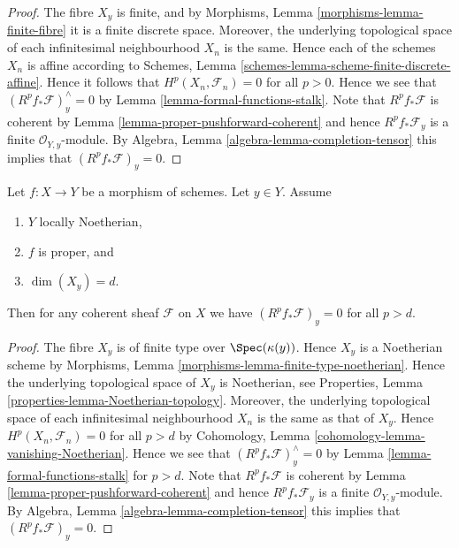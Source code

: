 \begin{proof}
The fibre $X_y$ is finite, and by
Morphisms, Lemma \ref{morphisms-lemma-finite-fibre} it
is a finite discrete space. Moreover, the underlying topological
space of each infinitesimal neighbourhood $X_n$ is the same.
Hence each of the schemes $X_n$ is affine according to
Schemes, Lemma \ref{schemes-lemma-scheme-finite-discrete-affine}.
Hence it follows that $H^p(X_n, \mathcal{F}_n) = 0$ for all
$p > 0$. Hence we see that $(R^pf_*\mathcal{F})_y^\wedge = 0$
by Lemma \ref{lemma-formal-functions-stalk}.
Note that $R^pf_*\mathcal{F}$ is coherent by
Lemma \ref{lemma-proper-pushforward-coherent} and
hence $R^pf_*\mathcal{F}_y$ is a finite
$\mathcal{O}_{Y, y}$-module.
By Algebra, Lemma \ref{algebra-lemma-completion-tensor}
this implies that $(R^pf_*\mathcal{F})_y = 0$.
\end{proof}

\begin{lemma}
\label{lemma-higher-direct-images-zero-above-dimension-fibre}
Let $f : X \to Y$ be a morphism of schemes.
Let $y \in Y$.
Assume
\begin{enumerate}
\item $Y$ locally Noetherian,
\item $f$ is proper, and
\item $\dim(X_y) = d$.
\end{enumerate}
Then for any coherent sheaf $\mathcal{F}$ on $X$ we have
$(R^pf_*\mathcal{F})_y = 0$ for all $p > d$.
\end{lemma}

\begin{proof}
The fibre $X_y$ is of finite type over $\Spec(\kappa(y))$.
Hence $X_y$ is a Noetherian scheme by
Morphisms, Lemma \ref{morphisms-lemma-finite-type-noetherian}.
Hence the underlying topological space of $X_y$ is Noetherian, see
Properties, Lemma \ref{properties-lemma-Noetherian-topology}.
Moreover, the underlying topological space of each infinitesimal
neighbourhood $X_n$ is the same as that of $X_y$.
Hence $H^p(X_n, \mathcal{F}_n) = 0$ for all $p > d$ by
Cohomology, Lemma \ref{cohomology-lemma-vanishing-Noetherian}.
Hence we see that $(R^pf_*\mathcal{F})_y^\wedge = 0$
by Lemma \ref{lemma-formal-functions-stalk} for $p > d$.
Note that $R^pf_*\mathcal{F}$ is coherent by
Lemma \ref{lemma-proper-pushforward-coherent} and
hence $R^pf_*\mathcal{F}_y$ is a finite
$\mathcal{O}_{Y, y}$-module.
By Algebra, Lemma \ref{algebra-lemma-completion-tensor}
this implies that $(R^pf_*\mathcal{F})_y = 0$.
\end{proof}








